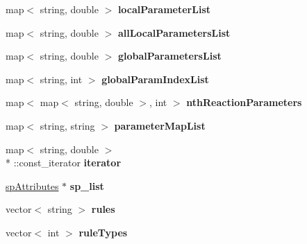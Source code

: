 \begin{DoxyCompactItemize}
\item 
\hypertarget{class_s_b_m_l_info_a6e31f93a3e57fb620c52425d3a998acc}{map$<$ string, double $>$ {\bfseries local\-Parameter\-List}}\label{class_s_b_m_l_info_a6e31f93a3e57fb620c52425d3a998acc}

\item 
\hypertarget{class_s_b_m_l_info_a21f1b0626dfd573791328046108411a0}{map$<$ string, double $>$ {\bfseries all\-Local\-Parameters\-List}}\label{class_s_b_m_l_info_a21f1b0626dfd573791328046108411a0}

\item 
\hypertarget{class_s_b_m_l_info_a62377c94d07004d4a8375da7439b3b39}{map$<$ string, double $>$ {\bfseries global\-Parameters\-List}}\label{class_s_b_m_l_info_a62377c94d07004d4a8375da7439b3b39}

\item 
\hypertarget{class_s_b_m_l_info_aee53d1590a6ee3c50faffbb4da1ef127}{map$<$ string, int $>$ {\bfseries global\-Param\-Index\-List}}\label{class_s_b_m_l_info_aee53d1590a6ee3c50faffbb4da1ef127}

\item 
\hypertarget{class_s_b_m_l_info_a0e352ec4c8ecb537d8c20d286d25b16f}{map$<$ map$<$ string, double $>$, int $>$ {\bfseries nth\-Reaction\-Parameters}}\label{class_s_b_m_l_info_a0e352ec4c8ecb537d8c20d286d25b16f}

\item 
\hypertarget{class_s_b_m_l_info_a66b575a78545f045100dd2e21f2f8d64}{map$<$ string, string $>$ {\bfseries parameter\-Map\-List}}\label{class_s_b_m_l_info_a66b575a78545f045100dd2e21f2f8d64}

\item 
\hypertarget{class_s_b_m_l_info_aa6ed0a2ef01c771b136c4b84c150e0ec}{map$<$ string, double $>$\\*
\-::const\-\_\-iterator {\bfseries iterator}}\label{class_s_b_m_l_info_aa6ed0a2ef01c771b136c4b84c150e0ec}

\item 
\hypertarget{class_s_b_m_l_info_a0c97f1452100cfafa071b9dd65b5c4ca}{\hyperlink{classsp_attributes}{sp\-Attributes} $\ast$ {\bfseries sp\-\_\-list}}\label{class_s_b_m_l_info_a0c97f1452100cfafa071b9dd65b5c4ca}

\item 
\hypertarget{class_s_b_m_l_info_a5d8d8e0b30c497db5cda47c212044107}{vector$<$ string $>$ {\bfseries rules}}\label{class_s_b_m_l_info_a5d8d8e0b30c497db5cda47c212044107}

\item 
\hypertarget{class_s_b_m_l_info_a975ca7234a9e07607a515cda719a1a12}{vector$<$ int $>$ {\bfseries rule\-Types}}\label{class_s_b_m_l_info_a975ca7234a9e07607a515cda719a1a12}


\end{DoxyCompactItemize}
